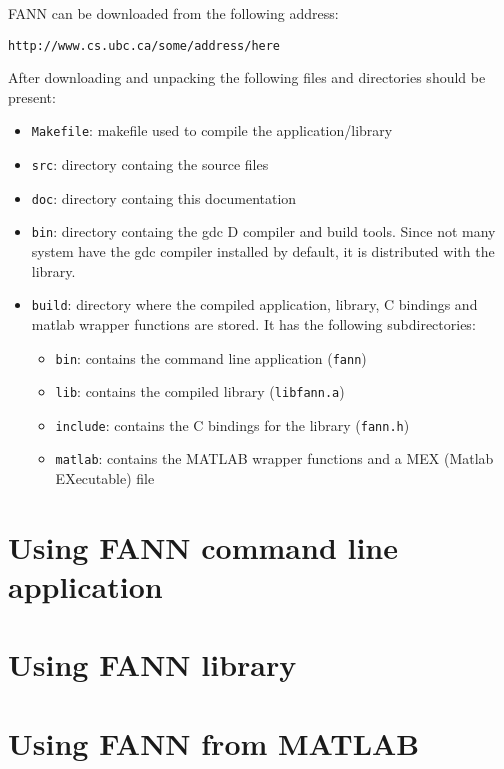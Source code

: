 \documentclass[letter,10pt]{article}
\begin{document}
FANN can be downloaded from the following address:
\begin{center}
\texttt{http://www.cs.ubc.ca/some/address/here}
\end{center}

After downloading and unpacking the following files and directories should be present:
\begin{itemize}
\item \texttt{Makefile}: makefile used to compile the application/library
\item \texttt{src}: directory containg the source files
\item \texttt{doc}: directory containg this documentation
\item \texttt{bin}: directory containg the gdc D compiler and build tools. Since not many system have the gdc compiler installed by default, it is distributed with the library.
\item \texttt{build}: directory where the compiled application, library, C bindings and matlab wrapper functions are stored. It has the following subdirectories:
\begin{itemize}
\item \texttt{bin}: contains the command line application (\texttt{fann})
\item \texttt{lib}: contains the compiled library (\texttt{libfann.a})
\item \texttt{include}: contains the C bindings for the library (\texttt{fann.h})
\item \texttt{matlab}: contains the MATLAB wrapper functions and a MEX (Matlab EXecutable) file
\end{itemize}



\end{itemize}


\section{Using FANN command line application}

\section{Using FANN library}

\section{Using FANN from MATLAB}
\end{document}
